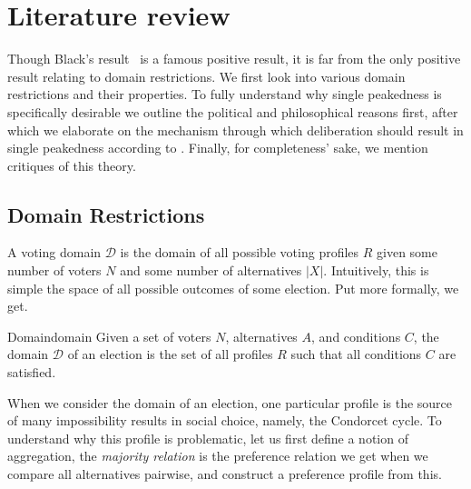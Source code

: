 \newpage
\chapter{Literature review}
\label{Literature}


Though Black's result~\citep{Black_1948} is a famous positive result, it is far from the only positive result relating to domain restrictions. We first look into various domain restrictions and their properties. To fully understand why single peakedness is specifically desirable we outline the political and philosophical reasons first, after which we elaborate on the mechanism through which deliberation should result in single peakedness according to \citet{List_2002}. Finally, for completeness' sake, we mention critiques of this theory.

\section{Domain Restrictions}
A voting domain $\mathcal{D}$ is the domain of all possible voting profiles \(R\) given some number of voters $N$ and some number of alternatives $|X|$. Intuitively, this is simple the space of all possible outcomes of some election. Put more formally, we get.

\begin{definition}{Domain}{domain}
	{
		Given a set of voters $N$, alternatives $A$, and conditions $C$, the domain $\mathcal{D}$ of an election is the set of all profiles $R$ such that all conditions $C$ are satisfied.
	}
\end{definition}

When we consider the domain of an election, one particular profile is the source of many impossibility results in social choice, namely, the Condorcet cycle. To understand why this profile is problematic, let us first define a notion of aggregation, the \textit{majority relation} is the preference relation we get when we compare all alternatives pairwise, and construct a preference profile from this. 


